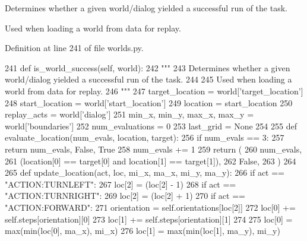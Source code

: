 \begin{DoxyVerb}Determines whether a given world/dialog yielded a successful run of the task.

Used when loading a world from data for replay.
\end{DoxyVerb}
 

Definition at line 241 of file worlds.\+py.


\begin{DoxyCode}
241     \textcolor{keyword}{def }is\_world\_success(self, world):
242         \textcolor{stringliteral}{"""}
243 \textcolor{stringliteral}{        Determines whether a given world/dialog yielded a successful run of the task.}
244 \textcolor{stringliteral}{}
245 \textcolor{stringliteral}{        Used when loading a world from data for replay.}
246 \textcolor{stringliteral}{        """}
247         target\_location = world[\textcolor{stringliteral}{'target\_location'}]
248         start\_location = world[\textcolor{stringliteral}{'start\_location'}]
249         location = start\_location
250         replay\_acts = world[\textcolor{stringliteral}{'dialog'}]
251         min\_x, min\_y, max\_x, max\_y = world[\textcolor{stringliteral}{'boundaries'}]
252         num\_evaluations = 0
253         last\_grid = \textcolor{keywordtype}{None}
254 
255         \textcolor{keyword}{def }evaluate\_location(num\_evals, location, target):
256             \textcolor{keywordflow}{if} num\_evals == 3:
257                 \textcolor{keywordflow}{return} num\_evals, \textcolor{keyword}{False}, \textcolor{keyword}{True}
258             num\_evals += 1
259             \textcolor{keywordflow}{return} (
260                 num\_evals,
261                 (location[0] == target[0] \textcolor{keywordflow}{and} location[1] == target[1]),
262                 \textcolor{keyword}{False},
263             )
264 
265         \textcolor{keyword}{def }update\_location(act, loc, mi\_x, ma\_x, mi\_y, ma\_y):
266             \textcolor{keywordflow}{if} act == \textcolor{stringliteral}{"ACTION:TURNLEFT"}:
267                 loc[2] = (loc[2] - 1) %
268             \textcolor{keywordflow}{if} act == \textcolor{stringliteral}{"ACTION:TURNRIGHT"}:
269                 loc[2] = (loc[2] + 1) %
270             \textcolor{keywordflow}{if} act == \textcolor{stringliteral}{"ACTION:FORWARD"}:
271                 orientation = self.orientations[loc[2]]
272                 loc[0] += self.steps[orientation][0]
273                 loc[1] += self.steps[orientation][1]
274 
275                 loc[0] = max(min(loc[0], ma\_x), mi\_x)
276                 loc[1] = max(min(loc[1], ma\_y), mi\_y)

\end{DoxyCode}
